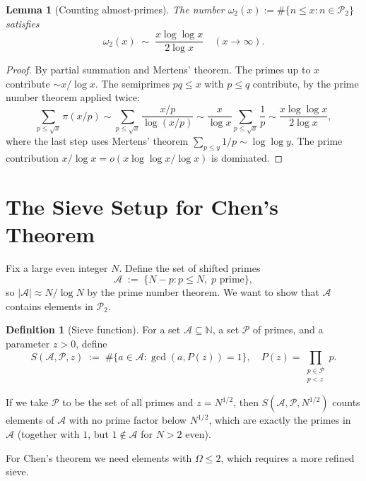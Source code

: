 \documentclass[12pt,a4paper]{amsart}
\newtheorem{lemma}[theorem]{Lemma}
\theoremstyle{definition}
\newtheorem{definition}[theorem]{Definition}
\newcommand{\N}{\mathbb{N}}
\newcommand{\Ptwo}{\mathcal{P}_2}
\newcommand{\OOmega}{\Omega}   %
\begin{document}
\begin{lemma}[Counting almost-primes]\label{lem:count_p2}
  The number $\omega_2(x) := \#\{n \leq x : n \in \Ptwo\}$ satisfies
  \[
    \omega_2(x) \;\sim\; \frac{x\log\log x}{2\log x}
    \quad (x \to \infty).
  \]
\end{lemma}

\begin{proof}
  By partial summation and Mertens' theorem.  The primes up to $x$
  contribute $\sim x/\log x$.  The semiprimes $pq \leq x$ with $p \leq q$
  contribute, by the prime number theorem applied twice:
  \[
    \sum_{p \leq \sqrt{x}}\pi(x/p)
    \sim \sum_{p \leq \sqrt{x}}\frac{x/p}{\log(x/p)}
    \sim \frac{x}{\log x}\sum_{p \leq \sqrt{x}}\frac{1}{p}
    \sim \frac{x\log\log x}{2\log x},
  \]
  where the last step uses Mertens' theorem
  $\sum_{p \leq y}1/p \sim \log\log y$.  The prime contribution
  $x/\log x = o(x\log\log x/\log x)$ is dominated.
\end{proof}

\section{The Sieve Setup for Chen's Theorem}

Fix a large even integer $N$.  Define the set of shifted primes
\[
  \mathcal{A} \;:=\; \{N - p : p \leq N,\; p \text{ prime}\},
\]
so $|\mathcal{A}| \approx N/\log N$ by the prime number theorem.
We want to show that $\mathcal{A}$ contains elements in $\Ptwo$.

\begin{definition}[Sieve function]
  For a set $\mathcal{A} \subseteq \N$, a set $\mathcal{P}$ of primes,
  and a parameter $z > 0$, define
  \[
    S(\mathcal{A}, \mathcal{P}, z)
    \;:=\;
    \#\bigl\{a \in \mathcal{A} : \gcd(a, P(z)) = 1\bigr\},
    \quad P(z) = \prod_{\substack{p \in \mathcal{P} \\ p < z}} p.
  \]
\end{definition}

If we take $\mathcal{P}$ to be the set of all primes and $z = N^{1/2}$, then
$S(\mathcal{A}, \mathcal{P}, N^{1/2})$ counts elements of $\mathcal{A}$ with
no prime factor below $N^{1/2}$, which are exactly the primes in $\mathcal{A}$
(together with $1$, but $1 \notin \mathcal{A}$ for $N > 2$ even).

For Chen's theorem we need elements with $\OOmega \leq 2$, which requires
a more refined sieve.
\end{document}

